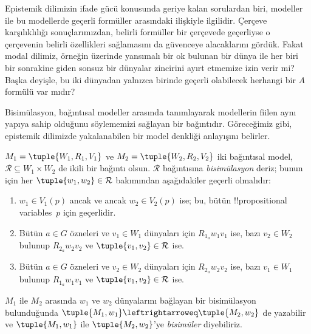 \documentclass[../../../include/open-logic-section]{subfiles}
\begin{document}


Epistemik dilimizin ifade gücü konusunda geriye kalan sorulardan biri,
modeller ile bu modellerde geçerli formüller arasındaki ilişkiyle ilgilidir.
Çerçeve karşılıklılığı sonuçlarımızdan, belirli formüller bir çerçevede
geçerliyse o çerçevenin belirli özellikleri sağlamasını da güvenceye
alacaklarını gördük. Fakat modal dilimiz, örneğin üzerinde yansımalı bir ok
bulunan bir dünya ile her biri bir sonrakine giden sonsuz bir dünyalar
zincirini ayırt etmemize izin verir mi? Başka deyişle, bu iki dünyadan
yalnızca birinde geçerli olabilecek herhangi bir $A$ formülü var mıdır?

Bisimülasyon, bağıntısal modeller arasında tanımlayarak modellerin fiilen aynı
yapıya sahip olduğunu söylememizi sağlayan bir bağıntıdır. Göreceğimiz gibi,
epistemik dilimizde yakalanabilen bir model denkliği anlayışını belirler.

\begin{defn}[Bisimülasyon]
$M_1 = \tuple{W_1, R_1, V_1}$ ve $M_2 = \tuple{W_2, R_2, V_2}$ iki
bağıntısal model, $\mathcal{R} \subseteq W_1 \times W_2$ de ikili bir bağıntı
olsun. $\mathcal{R}$ bağıntısına \emph{bisimülasyon} deriz; bunun için her
$\tuple{w_1, w_2} \in \mathcal{R}$ bakımından aşağıdakiler geçerli olmalıdır:

\begin{enumerate}
  \item $w_1 \in V_1(p)$ ancak ve ancak $w_2 \in V_2(p)$ ise; bu, bütün
  !!{propositional variable}s~$p$ için geçerlidir.
  \item Bütün $a \in G$ özneleri ve $v_1 \in W_1$ dünyaları için
  $R_{1_a} w_1 v_1$ ise, bazı $v_2 \in W_2$ bulunup $R_{2_a} w_2 v_2$ ve
  $\tuple{v_1, v_2} \in \mathcal{R}$ ise.
  \item Bütün $a \in G$ özneleri ve $v_2 \in W_2$ dünyaları için
   $R_{2_a} w_2 v_2$ ise, bazı $v_1 \in W_1$ bulunup $R_{1_a} w_1 v_1$ ve
   $\tuple{v_1, v_2} \in \mathcal{R}$ ise.
\end{enumerate}

$M_1$ ile $M_2$ arasında $w_1$ ve $w_2$ dünyalarını bağlayan bir bisimülasyon
bulunduğunda $\tuple{M_1, w_1} \leftrightarroweq \tuple{M_2, w_2}$ de
yazabilir ve $\tuple{M_1, w_1}$ ile $\tuple{M_2, w_2}$'ye
\emph{bisimüler} diyebiliriz.
\end{defn}
\end{document}
